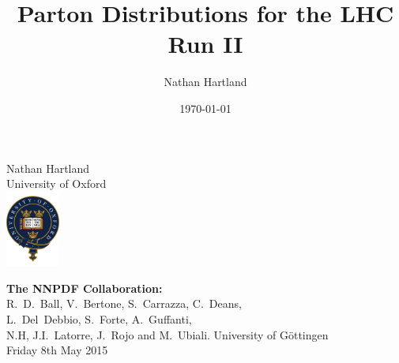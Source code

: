 \documentclass[10pt]{beamer}
\title[]{Parton Distributions for the LHC Run II}
\author{Nathan Hartland}
\institute
{
University of Oxford\\
\medskip
}
\date{\today}
\newcommand{\vso}{\vskip15pt}
\begin{document}
\renewcommand{\inserttotalframenumber}{34}

\begin{frame}
\begin{centering}
\vskip20pt
\vskip20pt
Nathan Hartland\\

\small{University of Oxford}\\
\vso
\includegraphics[height=2.5cm]{figures/OxfordCrest.pdf}

\vskip10pt
{\bf The NNPDF Collaboration:}\\
R.~D.~Ball, V.~Bertone, S.~Carrazza, C.~Deans,\\
 L.~Del~Debbio, S.~Forte, A.~Guffanti,\\
N.H, J.I.~Latorre, J.~Rojo and M.~Ubiali. 
\vskip20pt
University of G\"ottingen\\
Friday 8th May 2015

\end{centering}

\end{frame}
\end{document}
